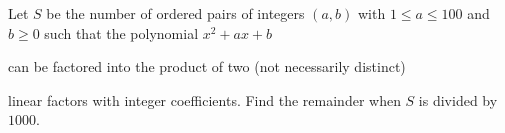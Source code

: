 Let $S$ be the number of ordered pairs of integers $(a,b)$ with $1 \leq a \leq 100$ and $b \geq 0$ such that the polynomial $x^2+ax+b$

 can be factored into the product of two (not necessarily distinct) 

linear factors with integer coefficients. Find the remainder when $S$ is divided by $1000$.